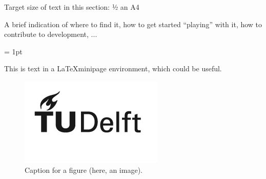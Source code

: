 \lbrack Target size of text in this section: ½ an A4\rbrack

A brief indication of where to find it, how to get started ``playing'' with it, how to contribute to development, ...

\fboxrule = 1pt


\begin{center}
    \begin{minipage}[tc]{30mm}
        This is text in a \LaTeX minipage environment, which could be useful.
    \end{minipage}
\end{center}

\begin{center}
    \begin{figure}[]
                \includegraphics[width=.5\linewidth]{tudelft_logo_black_2022.png}
        \caption[]{Caption for a figure (here, an image).}
    \end{figure}
\end{center}
